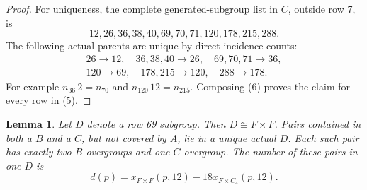 \documentclass[11pt,a4paper]{article}
\newtheorem{lemma}{Lemma}\newtheorem{theorem}{Theorem}
\begin{document}
\begin{proof}
For uniqueness, the complete generated-subgroup list in $C$, outside
row 7, is
\[
 12,26,36,38,40,69,70,71,120,178,215,288.                      \tag{5}
\]
The following actual parents are unique by direct incidence counts:
\[
\begin{gathered}
26\to12,\quad36,38,40\to26,\quad69,70,71\to36,\\
120\to69,\quad178,215\to120,\quad288\to178.
\end{gathered}                                               \tag{6}
\]
For example $n_{36}\,2=n_{70}$ and $n_{120}\,12=n_{215}$.
Composing (6) proves the claim for every row in (5).
\end{proof}

\begin{lemma}\label{BC}
Let $D$ denote a row 69 subgroup. Then $D\cong F\times F$.
Pairs contained in both a $B$ and a $C$, but not covered by $A$,
lie in a unique actual $D$. Each such pair has exactly two $B$
overgroups and one $C$ overgroup. The number of these pairs in one $D$
is
\[
       d(p)=x_{F\times F}(p,12)-18x_{F\times C_4}(p,12).       \tag{7}
\]
\end{lemma}
\end{document}
